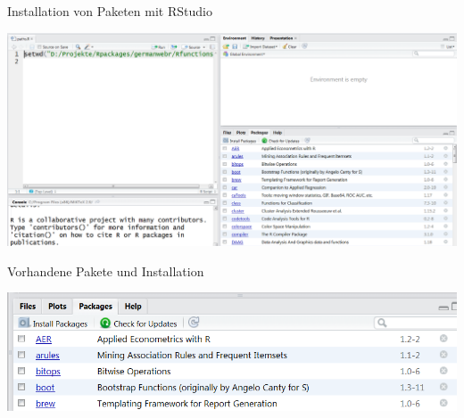\documentclass[
  ignorenonframetext,
]{beamer}
\begin{document}
\begin{frame}{Installation von Paketen mit RStudio}
\protect\hypertarget{installation-von-paketen-mit-rstudio}{}

\includegraphics{figure/PaketeRstudio.PNG}

\end{frame}

\begin{frame}{Vorhandene Pakete und Installation}
\protect\hypertarget{vorhandene-pakete-und-installation}{}

\includegraphics{figure/packages3.PNG}

\end{frame}
\end{document}
